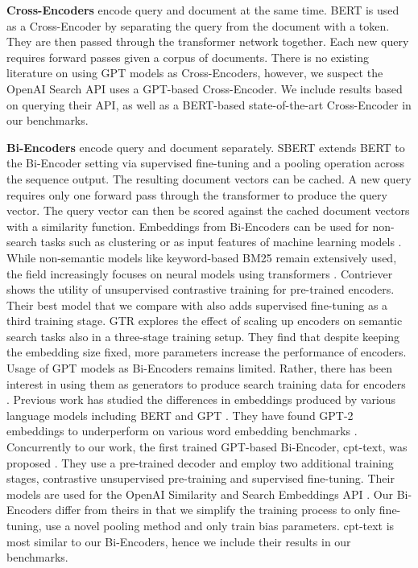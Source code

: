 \documentclass{article}
\begin{document}
\textbf{Cross-Encoders} encode query and document at the same time. BERT \cite{devlin2018bert} is used as a Cross-Encoder by separating the query from the document with a  token. They are then passed through the transformer network together. Each new query requires  forward passes given a corpus of  documents. There is no existing literature on using GPT models as Cross-Encoders, however, we suspect the OpenAI Search API \cite{openaisearch} uses a GPT-based Cross-Encoder. We include results based on querying their API, as well as a BERT-based state-of-the-art Cross-Encoder in our benchmarks.

\textbf{Bi-Encoders} encode query and document separately. SBERT \cite{reimers2019sentence} extends BERT to the Bi-Encoder setting via supervised fine-tuning and a pooling operation across the sequence output. The resulting document vectors can be cached. A new query requires only one forward pass through the transformer to produce the query vector. The query vector can then be scored against the cached document vectors with a similarity function. Embeddings from Bi-Encoders can be used for non-search tasks such as clustering or as input features of machine learning models \cite{reimers2019classification}. While non-semantic models like keyword-based BM25 \cite{robertson2009probabilistic} remain extensively used, the field increasingly focuses on neural models using transformers \cite{vaswani2017attention}. Contriever \cite{izacard2021towards} shows the utility of unsupervised contrastive training for pre-trained encoders. Their best model that we compare with also adds supervised fine-tuning as a third training stage. GTR \cite{ni2021large} explores the effect of scaling up encoders on semantic search tasks also in a three-stage training setup. They find that despite keeping the embedding size fixed, more parameters increase the performance of encoders. Usage of GPT models as Bi-Encoders remains limited. Rather, there has been interest in using them as generators to produce search training data for encoders \cite{schick2021generating, bonifacio2022inpars}. Previous work has studied the differences in embeddings produced by various language models including BERT and GPT \cite{ethayarajh2019contextual, liu2020survey, cai2020isotropy}. They have found GPT-2 embeddings to underperform on various word embedding benchmarks \cite{ethayarajh2019contextual}. Concurrently to our work, the first trained GPT-based Bi-Encoder, cpt-text, was proposed \citep{neelakantan2022text}. They use a pre-trained decoder and employ two additional training stages, contrastive unsupervised pre-training and supervised fine-tuning. Their models are used for the OpenAI Similarity and Search Embeddings API \cite{openaiembeddings}. Our Bi-Encoders differ from theirs in that we simplify the training process to only fine-tuning, use a novel pooling method and only train bias parameters. cpt-text is most similar to our Bi-Encoders, hence we include their results in our benchmarks.
\end{document}
